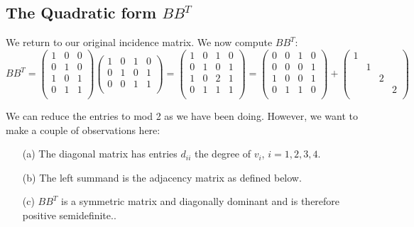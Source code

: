 \documentclass[10pt, letterpaper]{article}
\theoremstyle{remark}
\theoremstyle{definition}
\begin{document}
\subsection{The Quadratic form $BB^T$}
We return to our original incidence matrix.  We now compute $BB^T$:
\[
	BB^T = \begin{pmatrix}
		1 & 0 & 0 \\
		0 & 1 & 0 \\
		1 & 0 & 1 \\
		0 & 1 & 1 \\
	\end{pmatrix}
	\begin{pmatrix}
		1 & 0 & 1 & 0 \\
		0 & 1 & 0 & 1 \\
		0 & 0 & 1 & 1 \\
	\end{pmatrix} =
	\begin{pmatrix}
		1 & 0 & 1 & 0 \\
		0 & 1 & 0 & 1 \\
		1 & 0 & 2 & 1 \\
		0 & 1 & 1 & 1 \\
	\end{pmatrix} =
	\begin{pmatrix}
		0 & 0 & 1 & 0 \\
		0 & 0 & 0 & 1 \\
		1 & 0 & 0 & 1 \\
		0 & 1 & 1 & 0 \\
	\end{pmatrix} +
	\begin{pmatrix}
		1 \\
		 & 1 \\
		 & & 2 \\
		 & & & 2 \\
	\end{pmatrix}
\]

We can reduce the entries to mod 2 as we have been doing. However, we want to make a couple of observations here:

\begin{enumerate}
	\item[(a)] The diagonal matrix has entries $d_{ii}$ the degree of $v_i$, $i=1,2,3,4$.
	\item[(b)] The left summand is the adjacency matrix as defined below.
	\item[(c)] $BB^T$ is a symmetric matrix and diagonally dominant and is therefore positive semidefinite..
\end{enumerate}
\end{document}
